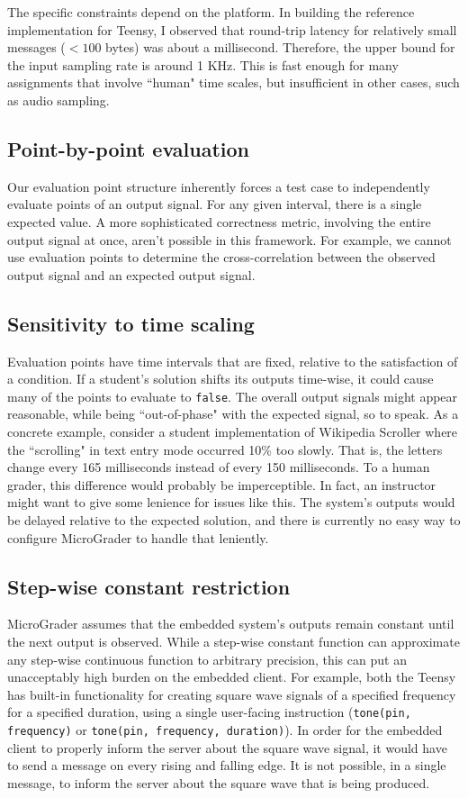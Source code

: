 \documentclass[12pt]{article}
\begin{document}
The specific constraints depend on the platform.  In building the reference implementation for Teensy, I observed that round-trip latency for relatively small messages ($<100$ bytes) was about a millisecond.  Therefore, the upper bound for the input sampling rate is around 1 KHz.  This is fast enough for many assignments that involve ``human" time scales, but insufficient in other cases, such as audio sampling.

\subsection{Point-by-point evaluation}
Our evaluation point structure inherently forces a test case to independently evaluate points of an output signal.  For any given interval, there is a single expected value.   A more sophisticated correctness metric, involving the entire output signal at once, aren't possible in this framework.  For example, we cannot use evaluation points to determine the cross-correlation between the observed output signal and an expected output signal.

\subsection{Sensitivity to time scaling}
Evaluation points have time intervals that are fixed, relative to the satisfaction of a condition.  If a student's solution shifts its outputs time-wise, it could cause many of the points to evaluate to \texttt{false}.  The overall output signals might appear reasonable, while being ``out-of-phase" with the expected signal, so to speak.  As a concrete example, consider a student implementation of Wikipedia Scroller where the ``scrolling" in text entry mode occurred 10\% too slowly.  That is, the letters change every 165 milliseconds instead of every 150 milliseconds.  To a human grader, this difference would probably be imperceptible.  In fact, an instructor might want to give some lenience for issues like this.  The system's outputs would be delayed relative to the expected solution, and there is currently no easy way to configure MicroGrader to handle that leniently.

\subsection{Step-wise constant restriction}
MicroGrader assumes that the embedded system's outputs remain constant until the next output is observed.  While a step-wise constant function can approximate any step-wise continuous function to arbitrary precision, this can put an unacceptably high burden on the embedded client.  For example, both the Teensy has built-in functionality for creating square wave signals of a specified frequency for a specified duration, using a single user-facing instruction (\texttt{tone(pin, frequency)} or \texttt{tone(pin, frequency, duration)}).  In order for the embedded client to properly inform the server about the square wave signal, it would have to send a message on every rising and falling edge.  It is not possible, in a single message, to inform the server about the square wave that is being produced.
\end{document}
